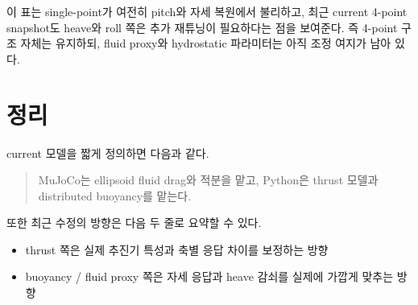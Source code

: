 \documentclass[11pt,a4paper]{article}
\begin{document}
이 표는 single-point가 여전히 pitch와 자세 복원에서 불리하고, 최근 current 4-point snapshot도 heave와 roll 쪽은 추가 재튜닝이 필요하다는 점을 보여준다. 즉 4-point 구조 자체는 유지하되, fluid proxy와 hydrostatic 파라미터는 아직 조정 여지가 남아 있다.

\section{정리}

current 모델을 짧게 정의하면 다음과 같다.

\begin{quote}
MuJoCo는 ellipsoid fluid drag와 적분을 맡고, Python은 thrust 모델과 distributed buoyancy를 맡는다.
\end{quote}

또한 최근 수정의 방향은 다음 두 줄로 요약할 수 있다.

\begin{itemize}[leftmargin=2em]
  \item thrust 쪽은 실제 추진기 특성과 축별 응답 차이를 보정하는 방향
  \item buoyancy / fluid proxy 쪽은 자세 응답과 heave 감쇠를 실제에 가깝게 맞추는 방향
\end{itemize}
\end{document}
